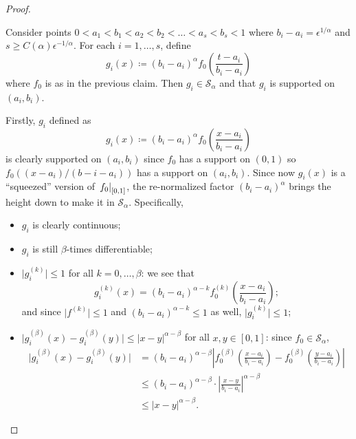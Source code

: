 \begin{proof}
	\begin{claim}
		Consider points \(0 < a_1 < b_1 < a_2 < b_2 < \dots < a_s < b_s < 1\) where \(b_i - a_i = \epsilon ^{1 / \alpha }\) and \(s \geq C(\alpha ) \epsilon ^{-1 / \alpha }\). For each \(i = 1, \dots , s\), define
		\[
			g_i(x) \coloneqq (b_i - a_i)^{\alpha } f_0 \left( \frac{t-a_i}{b_i - a_i} \right)
		\]
		where \(f_0\) is as in the previous claim. Then \(g_i \in \mathcal{S} _\alpha \) and that \(g_i\) is supported on \((a_i , b_i)\).
	\end{claim}
	\begin{explanation}
		Firstly, \(g_i\) defined as
		\[
			g_i(x) \coloneqq (b_i - a_i)^\alpha f_0 \left( \frac{x-a_i}{b_i - a_i} \right)
		\]
		is clearly supported on \((a_i, b_i)\) since \(f_0\) has a support on \((0, 1)\) so \(f_0((x - a_i) / (b-i - a_i))\) has a support on \((a_i, b_i)\). Since now \(g_i(x)\) is a ``squeezed'' version of \(\left.f_0\right\vert_{[0, 1]}^{} \), the re-normalized factor \((b_i - a_i)^\alpha \) brings the height down to make it in \(\mathcal{S} _\alpha \). Specifically,
		\begin{itemize}
			\item \(g_i\) is clearly continuous;
			\item \(g_i\) is still \(\beta \)-times differentiable;
			\item \(\vert g_i^{(k)} \vert \leq 1\) for all \(k = 0, \dots , \beta \): we see that
			      \[
				      g_i^{(k)} (x)
				      = (b_i - a_i)^{\alpha - k} f_{0} ^{(k)}\left( \frac{x-a_i}{b_i - a_i} \right) ;
			      \]
			      and since \(\vert f^{(k)} \vert \leq 1\) and \((b_i - a_i)^{\alpha - k} \leq 1\) as well, \(\vert g_i^{(k)} \vert \leq 1\);
			\item \(\vert g_i^{(\beta )}(x) - g_i^{(\beta )}(y) \vert \leq \vert x - y \vert ^{\alpha - \beta }\) for all \(x, y\in [0, 1]\): since \(f_0 \in \mathcal{S} _\alpha \),
			      \[
				      \begin{split}
					      \vert g_i^{(\beta )}(x) - g_i^{(\beta )}(y) \vert
					      &= (b_i - a_i)^{\alpha - \beta} \left\vert f_{0}^{(\beta )} \left( \frac{x-a_i}{b_i - a_i} \right) - f_{0}^{(\beta )} \left( \frac{y-a_i}{b_i - a_i} \right) \right\vert \\
					      &\leq (b_i - a_i)^{\alpha - \beta } \cdot \left\vert \frac{x - y}{b_i - a_i} \right\vert ^{\alpha - \beta } \\
					      &\leq \vert x - y \vert ^{\alpha -\beta }.
				      \end{split}
			      \]
		\end{itemize}


\end{explanation}
\end{proof}
